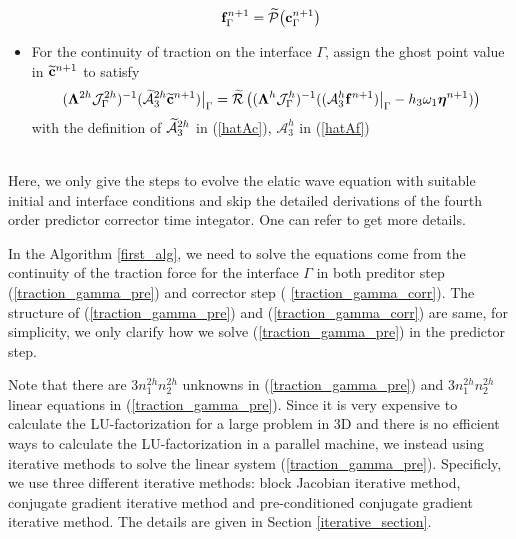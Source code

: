 \begin{breakablealgorithm}
\begin{itemize}
{			\begin{equation*}
			{\bf f}^{n+1}_{\Gamma} = \widetilde{\mathcal{P}}\big({\bf c}^{n+1}_{\Gamma}\big)
			\end{equation*}
		}
		\item{For the continuity of traction on the interface $\Gamma$, assign the ghost point value in $\widetilde{\bf c}^{n+1}$ to satisfy
			\begin{equation}\label{traction_gamma_corr}
			(\bm{\Lambda}^{2h}{\mathcal J}_{\Gamma}^{2h})^{-1}(\wt{\mathcal{A}}_3^{2h}\wt{\bf c}^{n+1})\big|_\Gamma
			= \wt{\mathcal{R}}\left((\bm{\Lambda}^{h}{\mathcal J}^h_{\Gamma})^{-1}((\mathcal{A}_3^h{\bf f}^{n+1})\big|_\Gamma-h_3\omega_1{\bm \eta}^{n+1})\right)
			\end{equation}
			with the definition of $\widetilde{\mathcal{A}}_3^{2h}$ in (\ref{hatAc}), $\mathcal{A}_3^h$ in (\ref{hatAf})
		}
	\end{itemize}
\end{breakablealgorithm}
~\\
Here, we only give the steps to evolve the elatic wave equation with suitable initial and interface conditions and skip the detailed derivations of the fourth order predictor corrector time integator. One can refer \cite{wang2018fourth} to get more details.

In the Algorithm \ref{first_alg}, we need to solve the equations come from the continuity of the traction force for the interface $\Gamma$ in both preditor step (\ref{traction_gamma_pre}) and corrector step (
\ref{traction_gamma_corr}). The structure of (\ref{traction_gamma_pre}) and (\ref{traction_gamma_corr}) are same, for simplicity, we only clarify how we solve (\ref{traction_gamma_pre}) in the predictor step.

Note that there are $3n_1^{2h}n_2^{2h}$ unknowns in (\ref{traction_gamma_pre}) and $3n_1^{2h}n_2^{2h}$ linear equations in (\ref{traction_gamma_pre}). Since it is very expensive to calculate the LU-factorization for a large problem in $3$D and there is no efficient ways to calculate the LU-factorization in a parallel machine, we instead using iterative methods to solve the linear system (\ref{traction_gamma_pre}). Specificly, we use three different iterative methods: block Jacobian iterative method, conjugate gradient iterative method and pre-conditioned conjugate gradient iterative method. The details are given in Section \ref{iterative_section}.
